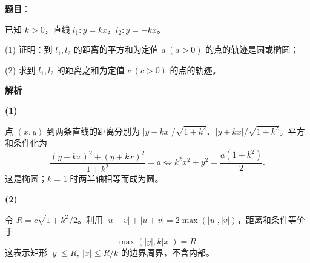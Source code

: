 \begin{answer}

\textbf{题目}：

已知 $k>0$，直线 $l_1:y=kx$，$l_2:y=-kx$。

(1) 证明：到 $l_1,l_2$ 的距离的平方和为定值 $a\ (a>0)$ 的点的轨迹是圆或椭圆；

(2) 求到 $l_1,l_2$ 的距离之和为定值 $c\ (c>0)$ 的点的轨迹。

\textbf{解析}

\textbf{(1)}

点 $(x,y)$ 到两条直线的距离分别为 $|y-kx|/\sqrt{1+k^2}$、$|y+kx|/\sqrt{1+k^2}$。平方和条件化为
\nopagebreak[4]
\[
\frac{(y-kx)^2+(y+kx)^2}{1+k^2}=a
\iff k^2x^2+y^2=\frac{a(1+k^2)}2.
\]
这是椭圆；$k=1$ 时两半轴相等而成为圆。

\textbf{(2)}

令 $R=c\sqrt{1+k^2}/2$。利用 $|u-v|+|u+v|=2\max(|u|,|v|)$，距离和条件等价于
\nopagebreak[4]
\[
\max(|y|,k|x|)=R.
\]
这表示矩形 $|y|\le R,\ |x|\le R/k$ 的边界周界，不含内部。



\end{answer}
